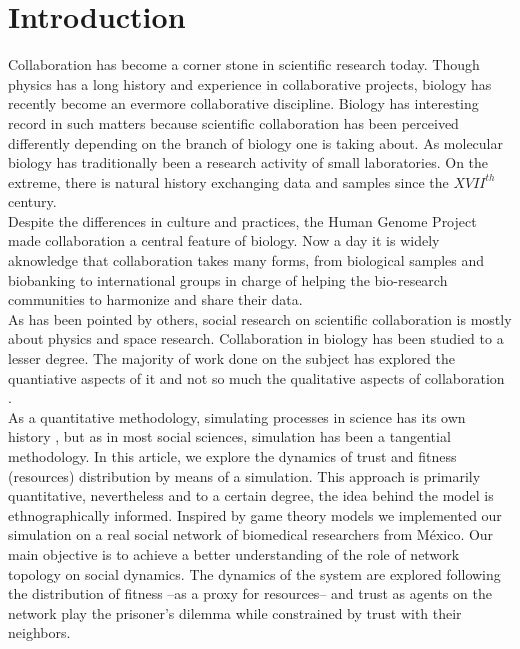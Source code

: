 \section{Introduction}
\label{intro}

Collaboration has become a corner stone in scientific research today.
Though physics has a long history and experience in collaborative
projects, biology has recently become an evermore collaborative
discipline\cite{Vermeulen2013}. Biology has interesting record in such
matters because scientific collaboration has been perceived
differently depending on the branch of biology one is taking about. As
molecular biology has traditionally been a research activity of small
laboratories\cite{KnorrCetina1999,Strasser2006}. On the extreme, there
is natural history exchanging data and samples since the $XVII^{th}$
century\cite{Muller2012,Strasser2012}.\\ 

Despite the differences in culture and practices, the Human Genome
Project made collaboration a central feature of biology. Now a day it
is widely aknowledge that collaboration takes many forms, from
biological samples and biobanking to international groups in charge of
helping the bio-research communities to harmonize and share their
data.\\ 

As has been pointed by others, social research on scientific
collaboration is mostly about physics and space research\cite{Vermeulen2013}.
Collaboration in biology has been studied to a lesser degree. The
majority of work done on the subject has explored the quantiative
aspects of it\cite{Newman2001,Newman2004,Elango2012,HernandezLemus2013} and not so much the
qualitative aspects of collaboration \cite{Strasser2006,Strasser2012}.\\


As a quantitative methodology, simulating processes in science has its own history
\cite{Gilbert1997,Edmonds2011}, but as in most social sciences, simulation has 
been a tangential methodology. In this article, we explore the dynamics of
trust and fitness (resources) distribution by means of a simulation.
This approach is primarily quantitative, nevertheless and to a certain
degree, the idea behind the model is ethnographically informed.
Inspired by game theory models we implemented our simulation on a 
real social network of biomedical researchers from M\'exico. Our main objective is
to achieve a better understanding of the role of network topology on
social dynamics. The dynamics of the system are explored following the
distribution of fitness --as a proxy for resources-- and trust as
agents on the network play the prisoner's dilemma while constrained by
trust with their neighbors.\\ 


